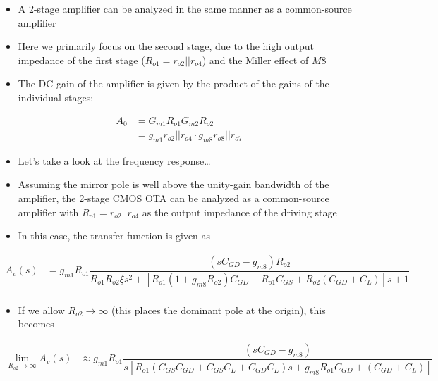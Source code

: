 \documentclass[11pt]{article}
\providecommand{\tightlist}{%
      \setlength{\itemsep}{0pt}\setlength{\parskip}{0pt}}
\begin{document}
    \begin{itemize}
\item
  A 2-stage amplifier can be analyzed in the same manner as a
  common-source amplifier
\item
  Here we primarily focus on the second stage, due to the high output
  impedance of the first stage (\(R_{o1} = r_{o2}||r_{o4}\)) and the
  Miller effect of \(M8\)
\item
  The DC gain of the amplifier is given by the product of the gains of
  the individual stages:
\end{itemize}

\begin{align}
A_0 &= G_{m1}R_{o1}G_{m2}R_{o2}\\
&= g_{m1}r_{o2}||r_{o4}\cdot g_{m8}r_{o8}||r_{o7}
\end{align}

\begin{itemize}
\tightlist
\item
  Let's take a look at the frequency response\ldots{}
\end{itemize}

    \begin{itemize}
\tightlist
\item
  Assuming the mirror pole is well above the unity-gain bandwidth of the
  amplifier, the 2-stage CMOS OTA can be analyzed as a common-source
  amplifier with \(R_{o1} = r_{o2}||r_{o4}\) as the output impedance of
  the driving stage
\item
  In this case, the transfer function is given as
\end{itemize}

\begin{align}
A_v(s) &= g_{m1}R_{o1}\dfrac{(sC_{GD} - g_{m8})R_{o2}}{R_{o1} R_{o2}\xi s^2 + [R_{o1}(1+g_{m8}R_{o2})C_{GD} + R_{o1} C_{GS}+R_{o2}(C_{GD} + C_L)]s+1} \\
\end{align}

\begin{itemize}
\tightlist
\item
  If we allow \(R_{o2} \rightarrow \infty\) (this places the dominant
  pole at the origin), this becomes
\end{itemize}

\begin{align}
\lim_{R_{o2} \rightarrow \infty}{A_v(s)} &\approx g_{m1}R_{o1}\dfrac{(sC_{GD} - g_{m8})}{s[R_{o1}(C_{GS}C_{GD}+C_{GS}C_L+C_{GD}C_L)s + g_{m8}R_{o1}C_{GD} + (C_{GD} + C_L)]}\\
\end{align}
\end{document}
